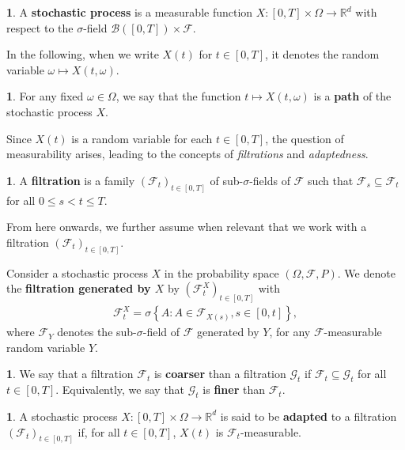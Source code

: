 \documentclass[english]{article}
\numberwithin{equation}{section}
\numberwithin{figure}{section}
\theoremstyle{bolddescit}
\theoremstyle{definition}
\newtheorem{definition}[theorem]{\protect\definitionname}
\theoremstyle{definition}
\theoremstyle{plain}
\theoremstyle{plain}
\theoremstyle{bolddesc}
\theoremstyle{plain}
\theoremstyle{remark}
\providecommand{\definitionname}{Definition}
\begin{document}
\begin{definition}
  A \textbf{stochastic process} is a measurable function $X : [0,T] \times \Omega \to \mathbb{R}^d$ with respect to the $\sigma$-field $\mathcal{B}([0,T]) \times \mathcal{F}$.
\end{definition}

In the following, when we write $X(t)$ for $t \in [0,T]$, it denotes the random variable $\omega \mapsto X(t, \omega)$.

\begin{definition}
  For any fixed $\omega \in \Omega$, we say that the function $t \mapsto X(t,\omega)$ is a \textbf{path} of the stochastic process $X$.
\end{definition}

Since $X(t)$ is a random variable for each $t \in [0,T]$, the question of measurability arises, leading to the concepts of \textit{filtrations} and \textit{adaptedness}.

\begin{definition}
  A \textbf{filtration} is a family $(\mathcal{F}_t)_{t \in [0,T]}$ of sub-$\sigma$-fields of $\mathcal{F}$ such that $\mathcal{F}_s \subseteq \mathcal{F}_t$ for all $0 \le s < t \le T$.
\end{definition}

From here onwards, we further assume when relevant that we work with a filtration $(\mathcal{F}_t)_{t \in [0,T]}$.

Consider a stochastic process $X$ in the probability space $(\Omega, \mathcal{F}, P)$. We denote the \textbf{filtration generated by $X$} by $(\mathcal{F}^X_t)_{t \in [0,T]}$ with
\begin{align*}
  \mathcal{F}^X_t = \sigma \left\{ A : A \in \mathcal{F}_{X(s)}, s \in [0,t] \right\},
\end{align*}
where $\mathcal{F}_{Y}$ denotes the sub-$\sigma$-field of $\mathcal{F}$ generated by $Y$, for any $\mathcal{F}$-measurable random variable $Y$.

\begin{definition}
  We say that a filtration $\mathcal{F}_t$ is \textbf{coarser} than a filtration $\mathcal{G}_t$ if $\mathcal{F}_t \subseteq \mathcal{G}_t$ for all $t \in [0,T]$. Equivalently, we say that $\mathcal{G}_t$ is \textbf{finer} than $\mathcal{F}_t$.
\end{definition}

\begin{definition}
  A stochastic process $X : [0,T] \times \Omega \to \mathbb{R}^d$ is said to be \textbf{adapted} to a filtration $(\mathcal{F}_t)_{t \in [0,T]}$ if, for all $t \in [0,T]$, $X(t)$ is $\mathcal{F}_t$-measurable.
\end{definition}
\end{document}

